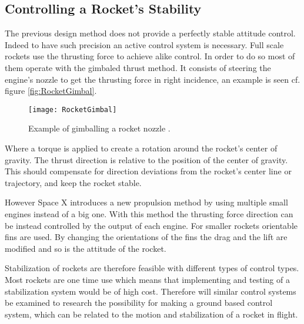 \subsection{Controlling a Rocket's Stability}
The previous design method does not provide a perfectly stable attitude control. Indeed to have such precision an active control system is necessary. Full scale rockets use the thrusting force to achieve alike control. In order to do so most of them operate with the gimbaled thrust method. It consists of steering the engine's nozzle to get the thrusting force in right incidence, an example is seen cf. figure \autoref{fig:RocketGimbal}. 
\begin{figure} [htbp]
	\centering
	\texttt{[image: RocketGimbal]}
	\caption{Example of gimballing a rocket nozzle \cite{web:rocketnasa}.}
	\label{fig:RocketGimbal}
\end{figure}

Where a torque is applied to create a rotation around the rocket's center of gravity. The thrust direction is relative to the position of the center of gravity.  This should compensate for direction deviations from the rocket's center line or trajectory, and keep the rocket stable.    	

However Space X introduces a new propulsion method by using multiple small engines instead of a big one. With this method the thrusting force direction can be instead controlled by the output of each engine. For smaller rockets orientable fins are used. By changing the orientations of the fins the drag and the lift are modified and so is the attitude of the rocket.


Stabilization of rockets are therefore feasible with different types of control types. Most rockets are one time use which means that implementing and testing of a stabilization system would be of high cost. Therefore will similar control systems be examined to research the possibility for making a ground based control system, which can be related to the motion and stabilization of a rocket in flight. 